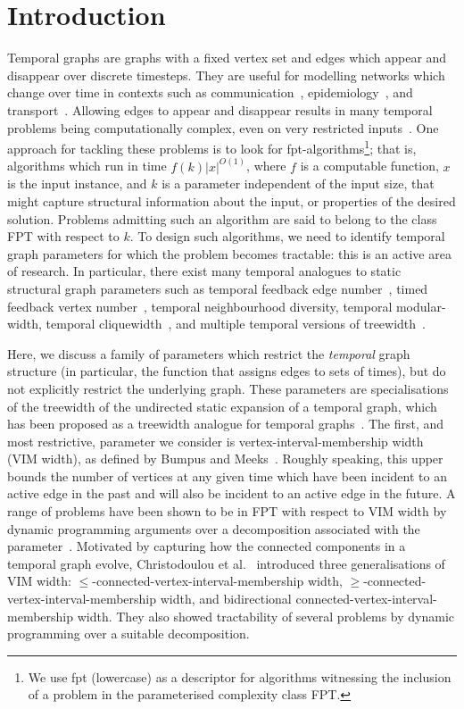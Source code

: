 \documentclass[a4paper,UKenglish,cleveref, autoref, thm-restate]{lipics-v2021} %
\begin{document}
\section{Introduction}
Temporal graphs are graphs with a fixed vertex set and edges which appear and disappear over discrete timesteps.
They are useful for modelling networks which change over time in contexts such as communication~\cite{baker_gossips_1972}, epidemiology~\cite{enright_deleting_2021}, and transport~\cite{fuchsle_temporal_2022}. Allowing edges to appear and disappear results in many temporal problems being computationally complex, even on very restricted inputs~\cite{akrida_temporal_2021,mertzios_computing_2023}. One approach for tackling these problems is to look for fpt-algorithms\footnote{We use fpt (lowercase) as a descriptor for algorithms witnessing the inclusion of a problem in the parameterised complexity class FPT.}; that is, algorithms which run in time $f(k)|x|^{O(1)}$, where $f$ is a computable function, $x$ is the input instance, and $k$ is a parameter independent of the input size, that might capture structural information about the input, or properties of the desired solution. Problems admitting such an algorithm are said to belong to the class FPT with respect to $k$.
To design such algorithms, we need to identify temporal graph parameters for which the problem becomes tractable: this is an active area of research. In particular, there exist many temporal analogues to static structural graph parameters such as temporal feedback edge number~\cite{haag_feedback_2022}, timed feedback vertex number~\cite{casteigts_finding_2021}, temporal neighbourhood diversity, temporal modular-width, temporal cliquewidth~\cite{enright_structural_2024}, and multiple temporal versions of treewidth~\cite{fluschnik_as_2020,mans_treewidth_2014}. 

Here, we discuss a family of parameters which restrict the \emph{temporal} graph structure (in particular, the function that assigns edges to sets of times), but do not explicitly restrict the underlying graph. These parameters are specialisations of the treewidth of the undirected static expansion of a temporal graph, which has been proposed as a treewidth analogue for temporal graphs~\cite{fluschnik_as_2020}. The first, and most restrictive, parameter we consider is vertex-interval-membership width (VIM width), as defined by Bumpus and Meeks~\cite{bumpus_edge_2023}. Roughly speaking, this upper bounds the number of vertices at any given time which have been incident to an active edge in the past and will also be incident to an active edge in the future. A range of problems have been shown to be in FPT with respect to VIM width by dynamic programming arguments over a decomposition associated with the parameter~\cite{bumpus_edge_2023,enright_counting_2023,hand_making_2022}. Motivated by capturing how the connected components in a temporal graph evolve, Christodoulou et al.~\cite{christodoulou_making_2024} introduced three generalisations of VIM width: $\leq$-connected-vertex-interval-membership width, $\geq$-connected-vertex-interval-membership width, and bidirectional connected-vertex-interval-membership width. They also showed tractability of several problems by dynamic programming over a suitable decomposition.
\end{document}
